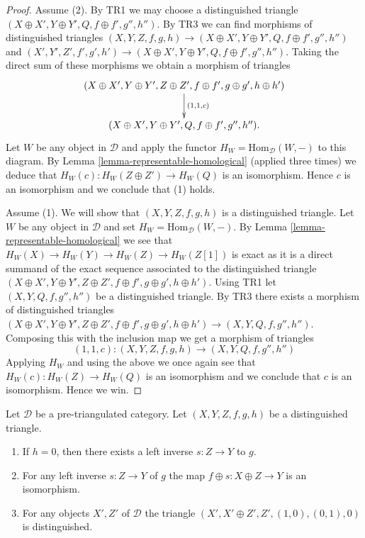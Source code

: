 \begin{proof}
Assume (2). By TR1 we may choose a distinguished triangle
$(X \oplus X', Y \oplus Y', Q, f \oplus f', g'', h'')$.
By TR3 we can find morphisms of distinguished triangles
$(X, Y, Z, f, g, h) \to
(X \oplus X', Y \oplus Y', Q, f \oplus f', g'', h'')$
and
$(X', Y', Z', f', g', h') \to
(X \oplus X', Y \oplus Y', Q, f \oplus f', g'', h'')$.
Taking the direct sum of these morphisms
we obtain a morphism of triangles
$$
\xymatrix{
(X \oplus X', Y \oplus Y', Z \oplus Z',
f \oplus f', g \oplus g', h \oplus h')
\ar[d]^{(1, 1, c)} \\
(X \oplus X', Y \oplus Y', Q, f \oplus f', g'', h'').
}
$$
Let $W$ be any object in $\mathcal{D}$ and apply the functor
$H_W = \text{Hom}_{\mathcal{D}}(W, -)$ to this diagram.
By
Lemma \ref{lemma-representable-homological}
(applied three times)
we deduce that $H_W(c) : H_W(Z \oplus Z') \to H_W(Q)$
is an isomorphism. Hence $c$ is an isomorphism and we conclude that
(1) holds.

\medskip\noindent
Assume (1). We will show that $(X, Y, Z, f, g, h)$ is a distinguished
triangle. Let $W$ be any object in $\mathcal{D}$ and set
$H_W = \text{Hom}_{\mathcal{D}}(W, -)$. By
Lemma \ref{lemma-representable-homological}
we see that $H_W(X) \to H_W(Y) \to H_W(Z) \to H_W(Z[1])$ is exact as
it is a direct summand of the exact sequence associated to the distinguished
triangle $(X \oplus X', Y \oplus Y', Z \oplus Z',
f \oplus f', g \oplus g', h \oplus h')$. Using TR1 let
$(X, Y, Q, f, g'', h'')$ be a distinguished triangle. By TR3 there exists
a morphism of distinguished triangles
 $(X \oplus X', Y \oplus Y', Z \oplus Z',
f \oplus f', g \oplus g', h \oplus h') \to (X, Y, Q, f, g'', h'')$.
Composing this with the inclusion map we get a morphism of triangles
$$
(1, 1, c) :
(X, Y, Z, f, g, h)
\longrightarrow
(X, Y, Q, f, g'', h'')
$$
Applying $H_W$ and using the above we once again see that
$H_W(c) : H_W(Z) \to H_W(Q)$ is an isomorphism and we conclude that
$c$ is an isomorphism. Hence we win.
\end{proof}

\begin{lemma}
\label{lemma-split}
Let $\mathcal{D}$ be a pre-triangulated category.
Let $(X, Y, Z, f, g, h)$ be a distinguished triangle.
\begin{enumerate}
\item If $h = 0$, then there exists a left inverse $s : Z \to Y$ to $g$.
\item For any left inverse $s : Z \to Y$ of $g$ the map
$f \oplus s : X \oplus Z \to Y$ is an isomorphism.
\item For any objects $X', Z'$ of $\mathcal{D}$ the triangle
$(X', X' \oplus Z', Z', (1, 0), (0, 1), 0)$ is distinguished.
\end{enumerate}
\end{lemma}

